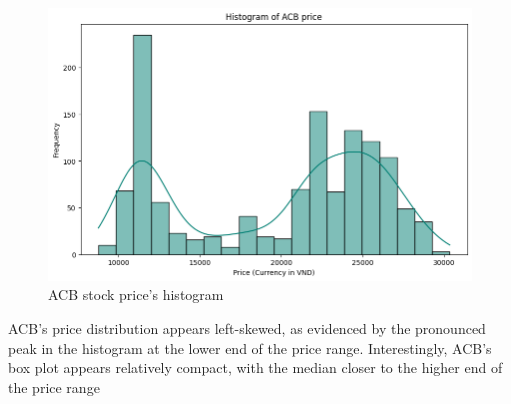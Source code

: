 \documentclass{ieeeojies}
\begin{document}
\begin{figure}[H]
\begin{minipage}{0.23\textwidth}
    \includegraphics[width=1\textwidth]{bibliography/Figure/ACBhist.png}
    \caption{ACB stock price's histogram}
    \label{fig:3}
    \end{minipage}
\end{figure}
    ACB's price distribution appears left-skewed, as evidenced by the pronounced peak in the histogram at the lower end of the price range. Interestingly, ACB's box plot appears relatively compact, with the median closer to the higher end of the price range
\end{document}
